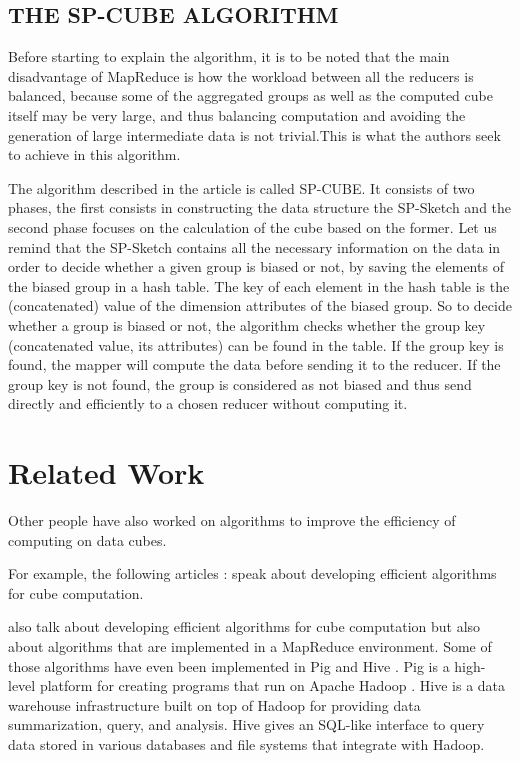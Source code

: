 \documentclass[10pt,journal,compsoc]{IEEEtran}
\begin{document}
\subsection{THE SP-CUBE ALGORITHM }

Before starting to explain the algorithm, it is to be noted that the main disadvantage of MapReduce is how the workload between all the reducers is balanced, because some of the aggregated groups as well as the computed cube itself may be very large, and thus balancing computation and avoiding the generation of large intermediate data is not trivial.This is what the authors seek to achieve in this algorithm. 


The algorithm described in the article is called SP-CUBE. It consists of two phases, the first consists in constructing the data structure the SP-Sketch and the second phase focuses on the calculation of the cube based on the former.
Let us remind that the SP-Sketch contains all the necessary information on the data in order to decide whether a given group is biased or not, by saving the elements of the biased group in a hash table. The key of each element in the hash table is the (concatenated) value of the dimension attributes of the biased group. So to decide whether a group is biased or not, the algorithm checks whether the group key (concatenated value, its attributes) can be found in the table. If the group key is found, the mapper will compute the data before sending it to the reducer. If the group key is not found, the group is considered as not biased and thus send directly and efficiently to a chosen reducer without computing it.

\section{Related Work}\label{sec:related}
Other people have also worked on algorithms to improve the efficiency of computing on data cubes. 

For example, the following articles : \cite{ksbeyer,myelta,kaross,ssarawagi,yzhao} speak about developing efficient algorithms for cube computation.

\cite{aabello,slee,anandi,svemuri} also talk about developing efficient algorithms for cube computation but also about algorithms that are implemented in a MapReduce environment. Some of those algorithms have even been implemented in Pig \cite{pig} and Hive \cite{hive}. Pig  is a high-level platform for creating programs that run on Apache Hadoop \cite{hadoop}. Hive  is a data warehouse infrastructure built on top of Hadoop for providing data summarization, query, and analysis. Hive gives an SQL-like interface to query data stored in various databases and file systems that integrate with Hadoop.
\end{document}
